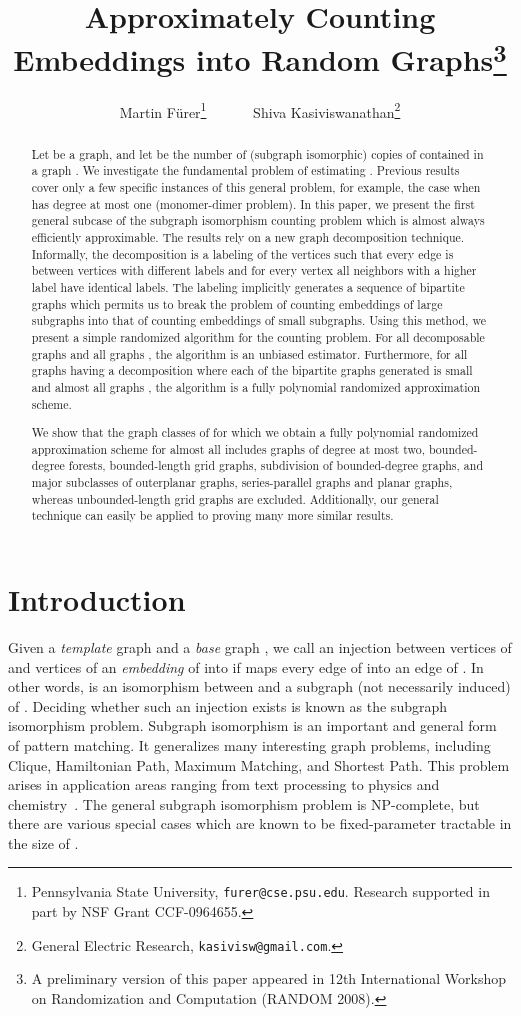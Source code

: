 \documentclass[11pt]{article}
\title{Approximately Counting Embeddings into Random Graphs\thanks{A preliminary version of this paper appeared in 12th International Workshop on Randomization and Computation (RANDOM 2008).}}
\author{Martin F\"urer\thanks{Pennsylvania State University, {\tt furer@cse.psu.edu}. Research supported in part by NSF Grant CCF-0964655.} \ \ \ \ \ \ Shiva Kasiviswanathan\thanks{General Electric Research, {\tt kasivisw@gmail.com}. }}
\begin{document}
\maketitle

\begin{abstract}
Let  be a graph, and let  be the number of (subgraph isomorphic) copies of  contained in a graph . We investigate the fundamental problem of estimating . Previous results cover only a few specific instances of this general problem, for example, the case when  has degree at most one (monomer-dimer problem). In this paper, we present the first general  subcase of the subgraph isomorphism counting problem which is almost always efficiently approximable. The results rely on a new graph decomposition technique.  Informally, the decomposition is a labeling of the vertices such that every edge is between vertices with different labels and for every vertex all neighbors with a higher label have identical labels. The labeling implicitly generates a sequence of bipartite graphs which permits us to break the problem of counting embeddings of large subgraphs into that of counting embeddings of small subgraphs. Using this method, we present a simple randomized algorithm for the counting problem.  For all decomposable graphs  and all graphs , the algorithm is an unbiased estimator. Furthermore, for all graphs  having a decomposition where each of the bipartite graphs generated is small and almost all graphs , the algorithm is a fully polynomial randomized approximation scheme. 

We show that the graph classes of  for which we obtain a fully polynomial randomized approximation scheme for almost all  includes graphs of degree at most two, bounded-degree forests, bounded-length grid  graphs, subdivision of bounded-degree graphs,  and major subclasses of outerplanar graphs, series-parallel graphs and planar graphs, whereas unbounded-length grid graphs are excluded.  Additionally, our general technique can easily be applied to proving many more similar results. 
\end{abstract}
\section{Introduction}
Given a {\em template} graph  and a {\em base} graph , we call an injection  between vertices of  and vertices of  an {\em embedding} of  into  if  maps every edge of  into an edge of . In other words,  is an isomorphism between  and a subgraph (not necessarily induced) of . Deciding whether such an injection exists is known as the subgraph isomorphism problem. Subgraph isomorphism is an important and general form of pattern matching. It generalizes many interesting graph problems, including Clique, Hamiltonian Path, Maximum Matching, and Shortest Path. This problem arises in application areas ranging from text processing to physics and chemistry~\cite{app1,app2,app3,app4}. The general subgraph isomorphism problem is NP-complete, but there are various special cases which are known to be fixed-parameter tractable in the size of  \cite{zwick}.
\end{document}
